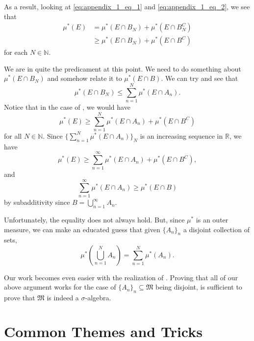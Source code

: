 \documentclass[notoc,notitlepage]{tufte-book}
\begin{document}
As a result, looking at \cref{eq:appendix_1_eq_1} and \cref{eq:appendix_1_eq_2},
we see that
\begin{align*}
  \mu^*(E) &= \mu^*(E \cap B_N) + \mu^*(E \cap B_N^C) \\
           &\geq \mu^*(E \cap B_N) + \mu^*(E \cap B^C)
\end{align*}
for each $N \in \mathbb{N}$.

We are in quite the predicament at this point.
We need to do something about $\mu^*(E \cap B_N)$
and somehow relate it to $\mu^*(E \cap B)$.
We can try and see that
\begin{equation*}
  \mu^*(E \cap B_N) \leq \sum_{n=1}^{N} \mu^*(E \cap A_n).
\end{equation*}
Notice that in the case of , we would have
\begin{equation*}
  \mu^*(E) \geq \sum_{n=1}^{N} \mu^*(E \cap A_n) + \mu^*(E \cap B^C)
\end{equation*}
for all $N \in \mathbb{N}$.
Since $\{ \sum_{n=1}^{N} \mu^*(E \cap A_n) \}_{N}$ is an increasing sequence
in $\mathbb{R}$, we have
\begin{equation*}
  \mu^*(E) \geq \sum_{n=1}^{\infty} \mu^*(E \cap A_n) + \mu^*(E \cap B^C),
\end{equation*}
and
\begin{equation*}
  \sum_{n=1}^{\infty} \mu^*(E \cap A_n) \geq \mu^*(E \cap B)
\end{equation*}
by subadditivity since $B = \bigcup_{n=1}^{\infty} A_n$.

Unfortunately, the equality does not always hold.
But, since $\mu^*$ is an outer measure,
we can make an educated guess
that given $\{ A_n \}_{n}$ a disjoint collection of sets,
\begin{equation*}
  \mu^* \left( \bigcup_{n=1}^{N} A_n \right) = \sum_{n=1}^{N} \mu^*(A_n).
\end{equation*}

Our work becomes even easier with the realization of .
Proving that all of our above argument works for the case of
$\{ A_n \}_{n} \subseteq \mathfrak{M}$ being disjoint,
is sufficient to prove that $\mathfrak{M}$ is indeed a $\sigma$-algebra.


\chapter{Common Themes and Tricks}%
\label{chp:common_themes_and_tricks}
\end{document}
